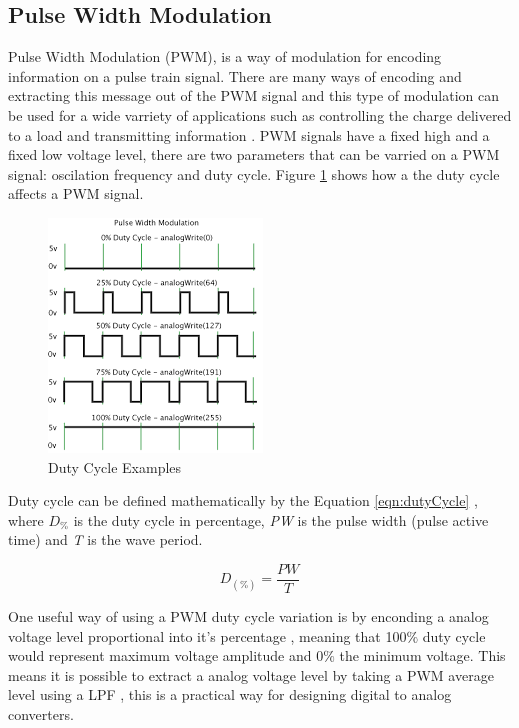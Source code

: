\subsection{Pulse Width Modulation} \label{ssec:pwm}
	
	Pulse Width Modulation (PWM), is a way of modulation for encoding information on a pulse train signal. There are many ways of encoding and extracting this message out of the PWM signal and this type of modulation can be used for a wide varriety of applications such as controlling the charge delivered to a load and transmitting information \cite{standard19961037c}. PWM signals have a fixed high and a fixed low voltage level, there are two parameters that can be varried on a PWM signal: oscilation frequency and duty cycle. Figure \ref{fig:dutyCycle} shows how a the duty cycle affects a PWM signal. 

	\begin{figure}[htbp]
		\centering
			\includegraphics[scale=0.4]{figuras/fig-dutyCycle}
		\caption{Duty Cycle Examples \cite{fig-dutyCycle}}
		\label{fig:dutyCycle}
	\end{figure}

	Duty cycle can be defined mathematically by the Equation \ref{eqn:dutyCycle} \cite{james2001fundamentals}, where \textit{$D_{\%}$} is the duty cycle in percentage, \textit{PW} is the pulse width (pulse active time) and \textit{T} is the wave period. 

	\begin{equation}\label{eqn:dutyCycle}
		D_{ \left( \% \right) } =\frac{PW}{T}
	\end{equation}

	One useful way of using a PWM duty cycle variation is by enconding a analog voltage level proportional into it's percentage \cite{holmes2003pulse}, meaning that 100$\%$ duty cycle would represent maximum voltage amplitude and 0$\%$ the minimum voltage. This means it is possible to extract a analog voltage level by taking a PWM average level using a LPF \cite{alter2008pwm}, this is a practical way for designing digital to analog converters.
		
